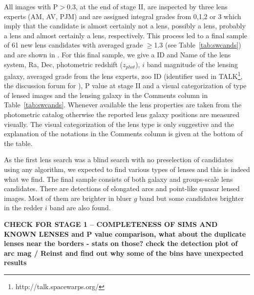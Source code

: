 \documentclass[useAMS,usenatbib,a4paper]{mn2e}
\begin{document}
All images with P$>$0.3, at the end of stage II, are inspected by three
lens experts (AM, AV, PJM) and are assigned integral grades from 0,1,2
or 3 which imply that the candidate is almost certainly not a lens,
possibly a lens, probably a lens and almost certainly a lens,
respectively. This process led to a final sample of 61 new lens
candidates with averaged grade $\ge$1.3 (see Table~\ref{tab:swcands})
and are shown in . For this final sample, we give a \sw ID
and Name of the lens system, Ra, Dec, photometric redshift ($z_{phot}$),
$i$ band magnitude of the lensing galaxy, averaged grade from the lens
experts, zoo ID (identifier used in
TALK\footnote{http://talk.spacewarps.org/}, the discussion forum for
\sw), P value at stage II and a visual categorization of type of lensed
images and the lensing galaxy in the Comments column in
Table~\ref{tab:swcands}. Whenever available the lens properties are
taken from the \cfhtls photometric catalog \citep{Coupon2009} otherwise
the reported lens galaxy positions are measured visually. The visual
categorization of the lens type is only suggestive and the explanation
of the notations in the Comments column is given at the bottom of the
table.    

As the first lens search was a blind search with no preselection of
candidates using any algorithm, we expected to find various types of
lenses and this is indeed what we find. The final sample consists of
both galaxy and groups-scale lens candidates. There are detections of
elongated arcs and point-like quasar lensed images. Most of them are
brighter in bluer $g$ band but some candidates brighter in the redder
$i$ band are also found.


{\bf CHECK FOR STAGE 1 -- COMPLETENESS OF SIMS AND KNOWN LENSES
and P value comparison, what about the duplicate lenses near the borders
- stats on those?  check the detection plot of arc mag / Reinst and find out why some of
the bins have unexpected results}
\end{document}

